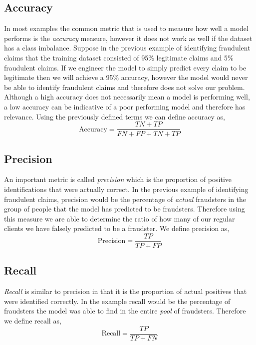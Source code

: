 \subsection{Accuracy}
 In most examples the common metric that is used to measure how well a model performs is the \emph{accuracy} measure, however it does not work as well if the dataset has a class imbalance. Suppose in the previous example of identifying fraudulent claims that the training dataset consisted of 95\% legitimate claims and 5\% fraudulent claims. If we engineer the model to simply predict every claim to be legitimate then we will achieve a 95\% accuracy, however the model would never be able to identify fraudulent claims and therefore does not solve our problem. Although a high accuracy does not necessarily mean a model is performing well, a low accuracy can be indicative of a poor performing model and therefore has relevance. Using the previously defined terms we can define accuracy as,
\begin{equation}
    \mbox{Accuracy} = \frac{TN + TP}{FN + FP + TN + TP}
\end{equation}
\subsection{Precision}
An important metric is called \emph{precision} which is the proportion of positive identifications that were actually correct. In the previous example of identifying fraudulent claims, precision would be the percentage of \emph{actual} fraudsters in the group of people that the model has predicted to be fraudsters. Therefore using this measure we are able to determine the ratio of how many of our regular clients we have falsely predicted to be a fraudster. We define precision as,
\begin{equation}
    \mbox{Precision} = \frac{TP}{TP + FP}
\end{equation}
\subsection{Recall}
\emph{Recall} is similar to precision in that it is the proportion of actual positives that were identified correctly. In the example recall would be the percentage of fraudsters the model was able to find in the entire \emph{pool} of fraudsters. Therefore we define recall as,
\begin{equation}
    \mbox{Recall} = \frac{TP}{TP + FN}
\end{equation}
